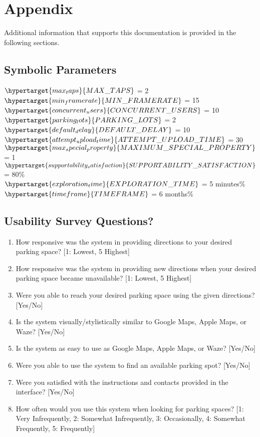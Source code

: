 \documentclass[12pt, titlepage]{article}
\begin{document}
\newpage

\section{Appendix}

Additional information that supports this documentation is provided in the
following sections.

\subsection{Symbolic Parameters}
\noindent $\hypertarget{max_taps}{MAX\_TAPS}$ = 2 \\
$\hypertarget{min_framerate}{MIN\_FRAMERATE}$ = 15\\
$\hypertarget{concurrent_users}{CONCURRENT\_USERS}$ = 10\\
$\hypertarget{parking_lots}{PARKING\_LOTS}$ = 2\\
$\hypertarget{default_delay}{DEFAULT\_DELAY}$ = 10\\
$\hypertarget{attempt_upload_time}{ATTEMPT\_UPLOAD\_TIME}$ = 30 \\
$\hypertarget{max_special_property}{MAXIMUM\_SPECIAL\_PROPERTY}$ = 1 \\
$\hypertarget{supportability_satisfaction}{SUPPORTABILITY\_SATISFACTION}$ = 80\%
\\
$\hypertarget{exploration_time}{EXPLORATION\_TIME}$ = 5 minutes\% \\
$\hypertarget{timeframe}{TIMEFRAME}$ = 6 months\% \\
\subsection{Usability Survey Questions?}
\label{sec:7.2}

\begin{enumerate}
    \item How responsive was the system in providing directions to your desired
    parking space? [1: Lowest, 5 Highest]
    \item How responsive was the system in providing new directions when your
    desired parking space became unavailable? [1: Lowest, 5 Highest]
    \item Were you able to reach your desired parking space using the given
    directions? [Yes/No]
    \item Is the system visually/stylistically similar to Google Maps, Apple
    Maps, or Waze? [Yes/No]
    \item Is the system as easy to use as Google Maps, Apple Maps, or Waze?
    [Yes/No]
    \item Were you able to use the system to find an available parking spot?
    [Yes/No]
    \item Were you satisfied with the instructions and contacts provided in the
    interface? [Yes/No]
    \item How often would you use this system when looking for parking spaces?
    [1: Very Infrequently, 2: Somewhat Infrequently, 3: Occasionally, 4:
    Somewhat Frequently, 5: Frequently]
\end{enumerate}
\end{document}
